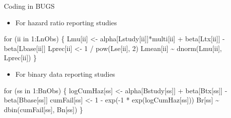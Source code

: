 \documentclass[
  ignorenonframetext,
]{beamer}
\newenvironment{Shaded}{\begin{snugshade}}{\end{snugshade}}
\newcommand{\ControlFlowTok}[1]{\textcolor[rgb]{0.00,0.23,0.31}{#1}}
\newcommand{\DecValTok}[1]{\textcolor[rgb]{0.68,0.00,0.00}{#1}}
\newcommand{\FunctionTok}[1]{\textcolor[rgb]{0.28,0.35,0.67}{#1}}
\newcommand{\NormalTok}[1]{\textcolor[rgb]{0.00,0.23,0.31}{#1}}
\newcommand{\OtherTok}[1]{\textcolor[rgb]{0.00,0.23,0.31}{#1}}
\newcommand{\SpecialCharTok}[1]{\textcolor[rgb]{0.37,0.37,0.37}{#1}}
\providecommand{\tightlist}{%
  \setlength{\itemsep}{0pt}\setlength{\parskip}{0pt}}\usepackage{longtable,booktabs,array}
\begin{document}
\begin{frame}[fragile]{Coding in BUGS}
\protect\hypertarget{coding-in-bugs-3}{}
\begin{itemize}
\tightlist
\item
  For hazard ratio reporting studies
\end{itemize}

\begin{Shaded}
\begin{Highlighting}[]
\ControlFlowTok{for}\NormalTok{ (ii }\ControlFlowTok{in} \DecValTok{1}\SpecialCharTok{:}\NormalTok{LnObs) \{}
\NormalTok{  Lmu[ii] }\OtherTok{\textless{}{-}}\NormalTok{ alpha[Lstudy[ii]]}\SpecialCharTok{*}\NormalTok{multi[ii] }\SpecialCharTok{+}\NormalTok{ beta[Ltx[ii]] }\SpecialCharTok{{-}}\NormalTok{ beta[Lbase[ii]]}
\NormalTok{  Lprec[ii] }\OtherTok{\textless{}{-}} \DecValTok{1} \SpecialCharTok{/} \FunctionTok{pow}\NormalTok{(Lse[ii], }\DecValTok{2}\NormalTok{)}
\NormalTok{  Lmean[ii] }\SpecialCharTok{\textasciitilde{}} \FunctionTok{dnorm}\NormalTok{(Lmu[ii], Lprec[ii])}
\NormalTok{\}}
\end{Highlighting}
\end{Shaded}

\begin{itemize}
\tightlist
\item
  For binary data reporting studies
\end{itemize}

\begin{Shaded}
\begin{Highlighting}[]
\ControlFlowTok{for}\NormalTok{ (ss }\ControlFlowTok{in} \DecValTok{1}\SpecialCharTok{:}\NormalTok{BnObs) \{}
\NormalTok{  logCumHaz[ss] }\OtherTok{\textless{}{-}}\NormalTok{ alpha[Bstudy[ss]] }\SpecialCharTok{+}\NormalTok{ beta[Btx[ss]] }\SpecialCharTok{{-}}\NormalTok{ beta[Bbase[ss]]}
\NormalTok{  cumFail[ss] }\OtherTok{\textless{}{-}} \DecValTok{1} \SpecialCharTok{{-}} \FunctionTok{exp}\NormalTok{(}\SpecialCharTok{{-}}\DecValTok{1} \SpecialCharTok{*} \FunctionTok{exp}\NormalTok{(logCumHaz[ss]))}
\NormalTok{  Br[ss] }\SpecialCharTok{\textasciitilde{}} \FunctionTok{dbin}\NormalTok{(cumFail[ss], Bn[ss])}
\NormalTok{  \}}
\end{Highlighting}
\end{Shaded}
\end{frame}
\end{document}
